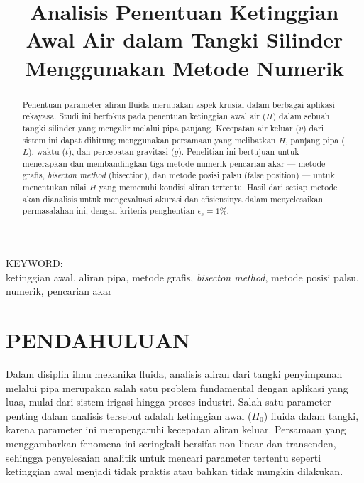 \documentclass[conference]{IEEEtran}
\begin{document}
\title{\textbf{Analisis Penentuan Ketinggian Awal Air dalam Tangki Silinder Menggunakan Metode Numerik}}

\author{
}

\maketitle

\begin{abstract}
Penentuan parameter aliran fluida merupakan aspek krusial dalam berbagai aplikasi rekayasa. Studi ini berfokus pada penentuan ketinggian awal air ($H$) dalam sebuah tangki silinder yang mengalir melalui pipa panjang. Kecepatan air keluar ($v$) dari sistem ini dapat dihitung menggunakan persamaan yang melibatkan $H$, panjang pipa ($L$), waktu ($t$), dan percepatan gravitasi ($g$). Penelitian ini bertujuan untuk menerapkan dan membandingkan tiga metode numerik pencarian akar — metode grafis, \textit{bisecton method} (bisection), dan metode posisi palsu (false position) — untuk menentukan nilai $H$ yang memenuhi kondisi aliran tertentu. Hasil dari setiap metode akan dianalisis untuk mengevaluasi akurasi dan efisiensinya dalam menyelesaikan permasalahan ini, dengan kriteria penghentian $\epsilon_s = 1\%$.
\end{abstract}

\begin{IEEEkeywords}
KEYWORD: \\
ketinggian awal, aliran pipa, metode grafis, \textit{bisecton method}, metode posisi palsu, numerik, pencarian akar
\end{IEEEkeywords}

\section{PENDAHULUAN}

Dalam disiplin ilmu mekanika fluida, analisis aliran dari tangki penyimpanan melalui pipa merupakan salah satu problem fundamental dengan aplikasi yang luas, mulai dari sistem irigasi hingga proses industri. Salah satu parameter penting dalam analisis tersebut adalah ketinggian awal ($H_0$) fluida dalam tangki, karena parameter ini mempengaruhi kecepatan aliran keluar. Persamaan yang menggambarkan fenomena ini seringkali bersifat non-linear dan transenden, sehingga penyelesaian analitik untuk mencari parameter tertentu seperti ketinggian awal menjadi tidak praktis atau bahkan tidak mungkin dilakukan.
\end{document}

